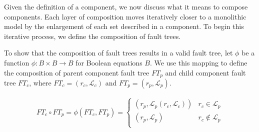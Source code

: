 Given the definition of a component, we now discuss what it means to compose components. Each layer of composition moves iteratively closer to a monolithic model by the enlargement of each set described in a component. To begin this iterative process, we define the composition of fault trees. 

To show that the composition of fault trees results in a valid fault tree, let $\phi$ be a function $\phi : B \times B \rightarrow B$ for Boolean equations $B$. We use this mapping to define the composition of parent component fault tree $\mathit{FT_p}$ and child component fault tree $\mathit{FT_c}$, where $\mathit{FT}_c = (r_c, \mathcal{L}_c)$ and $\mathit{FT}_p = (r_p, \mathcal{L}_p)$.

\begin{gather}
\mathit{FT}_c \circ \mathit{FT}_p = \phi(\mathit{FT}_c, \mathit{FT}_p) =\begin{cases} 
      (r_p, \mathcal{L}_p(r_c, \mathcal{L}_c)) & r_c \in \mathcal{L}_p \\
      (r_p, \mathcal{L}_p) & r_c \not\in \mathcal{L}_p \\
   \end{cases}
\label{eq:phi}
\end{gather}

